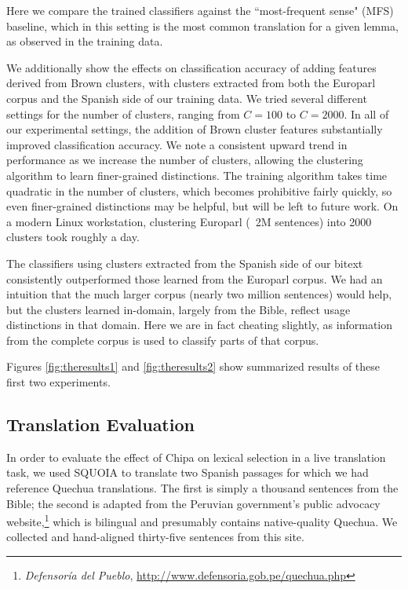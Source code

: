 Here we compare the trained classifiers against the ``most-frequent sense"
(MFS) baseline, which in this setting is the most common translation for a
given lemma, as observed in the training data.

We additionally show the effects on classification accuracy of adding features
derived from Brown clusters, with clusters extracted from both the Europarl
corpus and the Spanish side of our training data.
We tried several different
settings for the number of clusters, ranging from $C=100$ to $C=2000$.
In all of our experimental settings, the addition of Brown cluster features
substantially improved classification accuracy. We note a consistent upward
trend in performance as we increase the number of clusters, allowing the
clustering algorithm to learn finer-grained distinctions.
The training algorithm takes time quadratic in the number of clusters,
which becomes prohibitive fairly quickly, so even finer-grained distinctions
may be helpful, but will be left to future work. On a modern Linux
workstation, clustering Europarl (~2M sentences) into 2000 clusters took
roughly a day.

The classifiers using clusters extracted from the Spanish side of our bitext
consistently outperformed those learned from the Europarl corpus. We had an
intuition that the much larger corpus (nearly two million sentences) would
help, but the clusters learned in-domain, largely from the Bible, reflect
usage distinctions in that domain. Here we are in fact cheating slightly, as
information from the complete corpus is used to classify parts of that corpus.

Figures \ref{fig:theresults1} and \ref{fig:theresults2} show 
summarized results of these first two experiments.

\subsection{Translation Evaluation}
In order to evaluate the effect of Chipa on lexical selection in a live
translation task, we used SQUOIA to translate two Spanish passages for which we
had reference Quechua translations. The first is simply a thousand sentences
from the Bible; the second is adapted from the Peruvian government's public
advocacy website,\footnote{\emph{Defensoría del Pueblo},
\url{http://www.defensoria.gob.pe/quechua.php}} which is bilingual and
presumably contains native-quality Quechua. We collected and hand-aligned
thirty-five sentences from this site.

